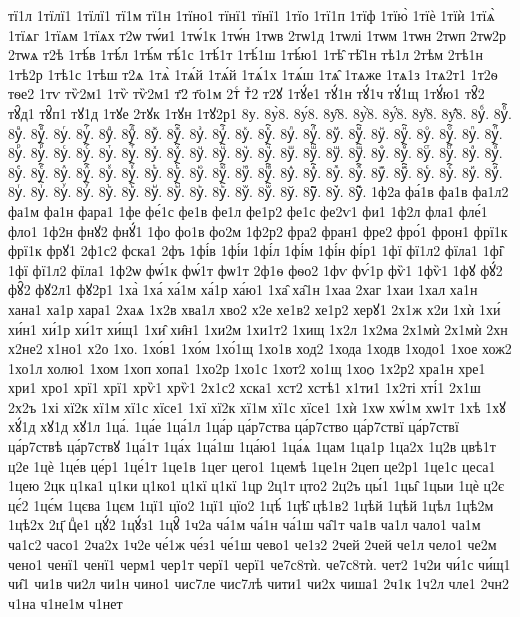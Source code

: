{тї1л
1тїлї1
1тїлї1
тї1м
тї1н
1тїно1
тїнї1
тїнї1
1тїо
1тї1п
1тїф
1тїю̀
1тїѐ
1тїѝ
1тїѧ̀
1тїѧг
1тїѧм
1тїѧх
т2ѡ
тѡ́и1
1тѡ́1к
1тѡ́н
1тѡв
2тѡ1д
1тѡлі
1тѡм
1тѡн
2тѡп
2тѡ2р
2тѡѧ
т2ѣ
1тѣ́в
1тѣ́л
1тѣ́м
тѣ́1с
1тѣ́1т
1тѣ́1ш
1тѣ́ю1
1тѣ̑
тѣ̑1н
тѣ1л
2тѣм
2тѣ1н
1тѣ2р
1тѣ1с
1тѣш
т2ѧ
1тѧ̀
1тѧ́й
1тѧ́й
1тѧ́1х
1тѧ́ш
1тѧ̑
1тѧже
1тѧ1з
1тѧ2т1
1т2ѳ
тѳе2
1тѵ
тѷ2м1
1тѷ
тѷ2м1
т҃2
т҃о1м
2тⷭ
тⷯ2
т2ꙋ
1тꙋ́е1
тꙋ́1н
тꙋ́1ч
тꙋ́1щ
1тꙋ́ю1
тꙋ̑2
тꙋ̑д1
тꙋ̑п1
тꙋ1д
1тꙋе
2тꙋк
1тꙋн
1тꙋ2р1
8у.
8у̀8.
8у́8.
8у̑8.
8у҆̀8.
8у҆́8.
8у҆̈8.
8у҆̑8.
8уⷠ.
8уⷠ҇.
8уⷡ.
8уⷡ҇.
8уⷢ.
8уⷢ҇.
8уⷣ.
8уⷣ҇.
8уⷤ.
8уⷤ҇.
8уⷥ.
8уⷥ҇.
8уⷦ.
8уⷦ҇.
8уⷧ.
8уⷧ҇.
8уⷨ.
8уⷨ҇.
8уⷩ.
8уⷩ҇.
8уⷪ.
8уⷪ҇.
8уⷫ.
8уⷫ҇.
8уⷬ.
8уⷬ҇.
8уⷭ.
8уⷭ҇.
8уⷮ.
8уⷮ҇.
8уⷯ.
8уⷯ҇.
8уⷰ.
8уⷰ҇.
8уⷱ.
8уⷱ҇.
8уⷲ.
8уⷲ҇.
8уⷳ.
8уⷳ҇.
8уⷴ.
8уⷴ҇.
8уⷵ.
8уⷵ҇.
8уⷶ.
8уⷶ҇.
8уⷷ.
8уⷷ҇.
8уⷸ.
8уⷸ҇.
8уⷹ.
8уⷹ҇.
8уⷺ.
8уⷺ҇.
8уⷻ.
8уⷻ҇.
8уⷼ.
8уⷼ҇.
8уⷽ.
8уⷽ҇.
8уⷾ.
8уⷾ҇.
8уⷿ.
8уⷿ҇.
8уꙴ.
8уꙴ҇.
8уꙵ.
8уꙵ҇.
8уꙶ.
8уꙶ҇.
8уꙷ.
8уꙷ҇.
8уꙸ.
8уꙸ҇.
8уꙹ.
8уꙹ҇.
8уꙺ.
8уꙺ҇.
8уꙻ.
8уꙻ҇.
8у꙼.
8у꙼҇.
8у꙽.
8у꙽҇.
1ф2а
фа́1в
фа1в
фа1л2
фа1м
фа1н
фара1
1фе
фе́1с
фе1в
фе1л
фе1р2
фе1с
фе2ѵ1
фи1
1ф2л
фла1
фле́1
фло1
1ф2н
фнꙋ2
фнꙋ́1
1фо
фо1в
фо2м
1ф2р2
фра2
фран1
фре2
фро́1
фрон1
фрї1к
фрї1к
фрꙋ1
2ф1с2
фска1
2фъ
1фі́в
1фі́и
1фі́л
1фі́м
1фі́н
фі́р1
1фї
фї1л2
фїла1
1фі̑
1фї
фї1л2
фїла1
1ф2ѡ
фѡ́1к
фѡ́1т
фѡ1т
2ф1ѳ
фѳо2
1фѵ
фѵ́1р
фѷ1
1фѷ1
1фꙋ
фꙋ́2
фꙋ̑2
фꙋ2л1
фꙋ2р1
1ха̀
1ха́
ха́1м
ха́1р
ха́ю1
1ха̑
ха̑1н
1хаа
2хаг
1хаи
1хал
ха1н
хана1
ха1р
хара1
2хаѧ
1х2в
хва1л
хво2
х2е
хе1в2
хе1р2
херꙋ1
2х1ж
х2и
1хѝ
1хи́
хи́н1
хи́1р
хи́1т
хи́щ1
1хи̑
хи̑н1
1хи2м
1хи1т2
1хищ
1х2л
1х2ма
2х1мѝ
2х1мѝ
2хн
х2не2
х1но1
х2о
1хо.
1хо́в1
1хо́м
1хо́1щ
1хо1в
ход2
1хода
1ходв
1ходо1
1хое
хож2
1хо1л
холю1
1хом
1хоп
хопа1
1хо2р
1хо1с
1хот2
хо1щ
1хоѻ
1х2р2
хра1н
хре1
хри1
хро1
хрї1
хрї1
хрѷ1
хрѷ1
2х1с2
хска1
хст2
хстѣ1
х1ти1
1х2ті
хті́1
2х1ш
2х2ъ
1хі
хї2к
хї1м
хї1с
хїсе1
1хї
хї2к
хї1м
хї1с
хїсе1
1хѝ
1хѡ
хѡ́1м
хѡ1т
1хѣ
1хꙋ
хꙋ́1д
хꙋ1д
хꙋ1л
1ца́.
1ца́е
1ца́1л
1ца́р
ца́р7ства
ца́р7ство
ца́р7ствї
ца́р7ствї
ца́р7ствѣ
ца́р7ствꙋ
1ца́1т
1ца́х
1ца́1ш
1ца́ю1
1ца́ѧ
1цам
1ца1р
1ца2х
1ц2в
цвѣ1т
ц2е
1цѐ
1це́в
це́р1
1це́1т
1це1в
1цег
цего1
1цемѣ
1це1н
2цеп
це2р1
1це1с
цеса1
1цею
2цк
ц1ка1
ц1ки
ц1ко1
ц1кї
ц1кї
1цр
2ц1т
цто2
2ц2ъ
цы́1
1цы̑
1цыи
1цѐ
ц2є
цє́2
1цє́м
1цєва
1цєм
1цї1
цїо2
1цї1
цїо2
1цѣ́
1цѣ̑
цѣ1в2
1цѣй
1цѣй
1цѣл
1цѣ2м
1цѣ2х
2ц҃
цⷣе1
цꙋ́2
1цꙋ́з1
1цꙋ̑
1ч2а
ча́1м
ча́1н
ча́1ш
ча̑1т
ча1в
ча1л
чало1
ча1м
ча1с2
часо1
2ча2х
1ч2е
че́1ж
че́з1
че́1ш
чево1
че1з2
2чей
2чей
че1л
чело1
че2м
чено1
ченї1
ченї1
черм1
чер1т
черї1
черї1
че7с8тѝ.
че7с8тѝ.
чет2
1ч2и
чи́1с
чи́щ1
чи̑1
чи1в
чи2л
чи1н
чино1
чис7ле
чис7лѣ
чити1
чи2х
чиша1
2ч1к
1ч2л
чле1
2чн2
ч1на
ч1не1м
ч1нет
}
